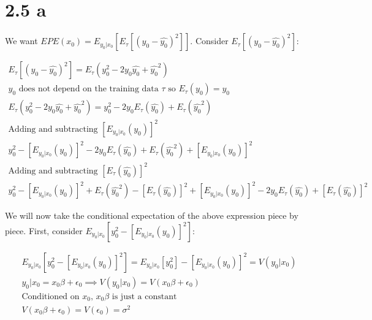 \section*{2.5 a}

\noindent
We want $EPE(x_{0}) = E_{y_{0} | x_{0}}[E_{\tau}[(y_{0} - \hat{y_{0}})^{2}]]$. 
Consider $E_{\tau}[(y_{0} - \hat{y_{0}})^{2}]$:

\begin{gather*}
E_{\tau}[(y_{0} - \hat{y_{0}})^{2}] = 
E_{\tau}(y_{0}^{2} - 2 y_{0} \hat{y_{0}} + \hat{y_{0}}^{2}) \\
y_{0} 
\text{ does not depend on the training data } 
\tau 
\text{ so } 
E_{\tau}(y_{0}) = y_{0} \\
E_{\tau}(y_{0}^{2} - 2 y_{0} \hat{y_{0}} + \hat{y_{0}}^{2})  = 
y_{0}^{2} - 2 y_{0} E_{\tau}(\hat{y_{0}}) + E_{\tau}(\hat{y_{0}}^{2}) \\ 
\text{Adding and subtracting } [E_{y_{0} | x_{0}}(y_{0})]^{2} \\ 
y_{0}^{2} - [E_{y_{0} | x_{0}}(y_{0})]^{2} - 2 y_{0} E_{\tau}(\hat{y_{0}}) + 
E_{\tau}(\hat{y_{0}}^{2}) + [E_{y_{0} | x_{0}}(y_{0})]^{2} \\
\text{Adding and subtracting } [E_{\tau}(\hat{y_{0}})]^{2} \\
y_{0}^{2} - [E_{y_{0} | x_{0}}(y_{0})]^{2} + 
E_{\tau}(\hat{y_{0}}^{2}) - [E_{\tau}(\hat{y_{0}})]^{2}
 + [E_{y_{0} | x_{0}}(y_{0})]^{2} - 2 y_{0} E_{\tau}(\hat{y_{0}}) + 
[E_{\tau}(\hat{y_{0}})]^{2}
\end{gather*}

\noindent
We will now take the conditional expectation of the above expression piece by 
piece. First, consider 
$ E_{y_{0} | x_{0}}[y_{0}^{2} - [E_{y_{0} | x_{0}}(y_{0})]^{2}]$:

\begin{gather*}
E_{y_{0} | x_{0}}[y_{0}^{2} - [E_{y_{0} | x_{0}}(y_{0})]^{2}] = 
E_{y_{0} | x_{0}}[y_{0}^{2}] - [E_{y_{0} | x_{0}}(y_{0})]^{2} = 
V(y_{0} | x_{0}) \\ 
y_{0} | x_{0} = x_{0} \beta + \epsilon_{0} \implies 
V(y_{0} | x_{0}) = V(x_{0} \beta + \epsilon_{0}) \\ 
\text{Conditioned on } 
x_{0} 
\text{, } 
x_{0} \beta 
\text{ is just a constant} \\
V(x_{0} \beta + \epsilon_{0}) = 
V(\epsilon_{0}) = 
\sigma^{2}
\end{gather*}

